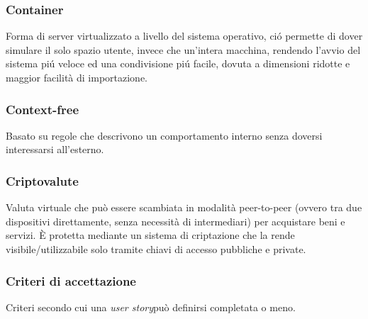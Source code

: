 \subsubsection*{Container}
Forma di server virtualizzato a livello del sistema operativo, ció permette di dover simulare il solo spazio utente, invece che un’intera macchina, rendendo l’avvio del sistema piú veloce ed una condivisione piú facile, dovuta a dimensioni ridotte e maggior facilità di importazione.
\subsubsection*{Context-free}
Basato su regole che descrivono un comportamento interno senza doversi interessarsi all'esterno.
\subsubsection*{Criptovalute}
Valuta virtuale che può essere scambiata in modalità peer-to-peer (ovvero tra due dispositivi direttamente, senza necessità di intermediari) per acquistare beni e servizi. È protetta mediante un sistema di criptazione che la rende visibile/utilizzabile solo tramite chiavi di accesso pubbliche e private.
\subsubsection*{Criteri di accettazione}
Criteri secondo cui una \textit{user story}\glo può definirsi completata o meno.
